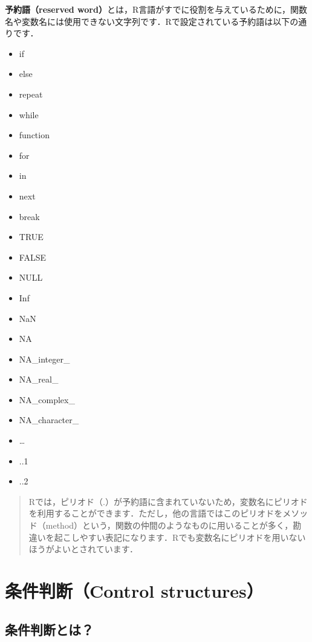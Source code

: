 \documentclass[
  letterpaper,
  DIV=11,
  numbers=noendperiod]{scrreprt}
\providecommand{\tightlist}{%
  \setlength{\itemsep}{0pt}\setlength{\parskip}{0pt}}\usepackage{longtable,booktabs,array}
\begin{document}
\textbf{予約語（reserved
word）}とは，R言語がすでに役割を与えているために，関数名や変数名には使用できない文字列です．Rで設定されている予約語は以下の通りです．

\begin{itemize}
\tightlist
\item
  if
\item
  else
\item
  repeat
\item
  while
\item
  function\\
\item
  for
\item
  in
\item
  next
\item
  break
\item
  TRUE
\item
  FALSE
\item
  NULL
\item
  Inf
\item
  NaN
\item
  NA
\item
  NA\_integer\_
\item
  NA\_real\_
\item
  NA\_complex\_
\item
  NA\_character\_
\item
  \ldots{}
\item
  ..1
\item
  ..2
\end{itemize}

\begin{quote}
Rでは，ピリオド（.）が予約語に含まれていないため，変数名にピリオドを利用することができます．ただし，他の言語ではこのピリオドをメソッド（method）という，関数の仲間のようなものに用いることが多く，勘違いを起こしやすい表記になります．Rでも変数名にピリオドを用いないほうがよいとされています．
\end{quote}


\hypertarget{ux6761ux4ef6ux5224ux65adcontrol-structures}{%
\chapter{条件判断（Control
structures）}\label{ux6761ux4ef6ux5224ux65adcontrol-structures}}

\hypertarget{ux6761ux4ef6ux5224ux65adux3068ux306f}{%
\section{条件判断とは？}\label{ux6761ux4ef6ux5224ux65adux3068ux306f}}
\end{document}
